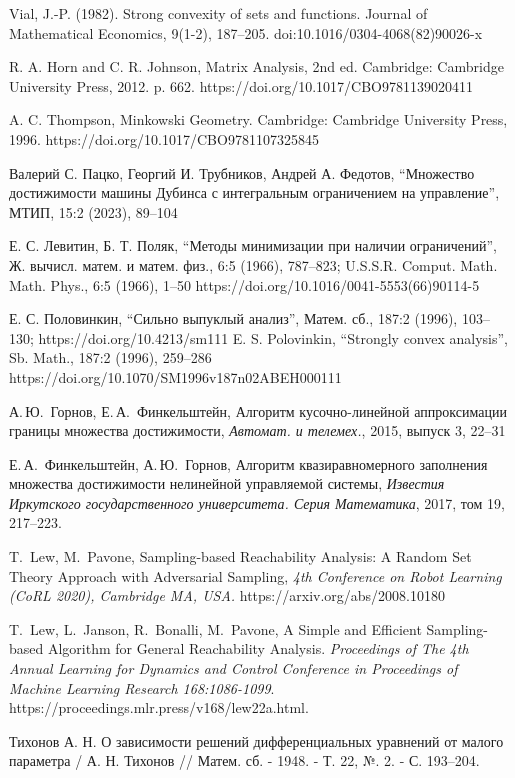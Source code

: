 \documentclass[../main.tex]{subfiles}
\begin{document}
\begin{thebibliography}{99}
Vial, J.-P. (1982). Strong convexity of sets and functions. Journal of Mathematical Economics, 9(1-2), 187–205. doi:10.1016/0304-4068(82)90026-x

 R. A. Horn and C. R. Johnson, Matrix Analysis, 2nd ed. Cambridge: Cambridge University Press, 2012. p. 662. https://doi.org/10.1017/CBO9781139020411
 
 A. C. Thompson, Minkowski Geometry. Cambridge: Cambridge University Press, 1996. 
 https://doi.org/10.1017/CBO9781107325845
 
 Валерий С. Пацко, Георгий И. Трубников, Андрей А. Федотов, “Множество достижимости машины Дубинса с интегральным ограничением на управление”, МТИП, 15:2 (2023), 89–104

Е. С. Левитин, Б. Т. Поляк, “Методы минимизации при наличии ограничений”, Ж. вычисл. матем. и матем. физ., 6:5 (1966), 787–823; U.S.S.R. Comput. Math. Math. Phys., 6:5 (1966), 1–50 https://doi.org/10.1016/0041-5553(66)90114-5

Е. С. Половинкин, “Сильно выпуклый анализ”, Матем. сб., 187:2 (1996), 103–130;  https://doi.org/10.4213/sm111 
E. S. Polovinkin, “Strongly convex analysis”, Sb. Math., 187:2 (1996), 259–286 https://doi.org/10.1070/SM1996v187n02ABEH000111

А.\,Ю.~Горнов, Е.\,А.~Финкельштейн, Алгоритм кусочно-линейной аппроксимации границы множества достижимости, {\it Автомат. и телемех.}, 2015, выпуск 3, 22–31

Е.\,А.~Финкельштейн, А.\,Ю.~Горнов, Алгоритм квазиравномерного заполнения множества достижимости нелинейной управляемой системы, {\it Известия Иркутского государственного университета. Серия Математика}, 2017, том 19, 217–223.

T.~Lew, M.~Pavone, Sampling-based Reachability Analysis: A Random Set Theory Approach with Adversarial Sampling, {\it 4th Conference on Robot Learning (CoRL 2020), Cambridge MA, USA.} https://arxiv.org/abs/2008.10180 

T.~Lew, L.~Janson, R.~Bonalli, M.~Pavone,  A Simple and Efficient Sampling-based Algorithm for General Reachability Analysis. {\it Proceedings of The 4th Annual Learning for Dynamics and Control Conference in Proceedings of Machine Learning Research
	168:1086-1099}. https://proceedings.mlr.press/v168/lew22a.html.
	
Тихонов А. Н. О зависимости решений дифференциальных уравнений от малого параметра / А. Н. Тихонов // Матем. сб. - 1948. - Т. 22, №. 2. - С. 193–204.


\end{thebibliography}
\end{document}
